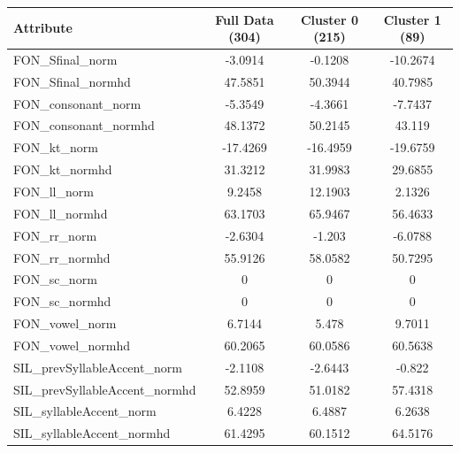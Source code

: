 \documentclass[11pt,a4paper,twoside]{tesis}
\begin{document}
\begin{table}[H]
\centering
\begin{tabular}{|l|c|c|c|}
\hline                                 
Attribute & Full Data (304)& Cluster 0 (215) & Cluster 1 (89) \\ \hline
\hline 
FON\_Sfinal\_norm                  &  -3.0914  &  -0.1208  & -10.2674 \\ \hline
FON\_Sfinal\_normhd                &  47.5851  &  50.3944  &  40.7985 \\ \hline 
FON\_consonant\_norm               &  -5.3549  &  -4.3661  &  -7.7437 \\ \hline
FON\_consonant\_normhd             &  48.1372  &  50.2145  &   43.119 \\ \hline
FON\_kt\_norm                      & -17.4269  & -16.4959  & -19.6759 \\ \hline
FON\_kt\_normhd                    &  31.3212  &  31.9983  &  29.6855 \\ \hline
FON\_ll\_norm                      &   9.2458  &  12.1903  &   2.1326 \\ \hline
FON\_ll\_normhd                    &  63.1703  &  65.9467  &  56.4633 \\ \hline
FON\_rr\_norm                      &  -2.6304  &   -1.203  &  -6.0788 \\ \hline
FON\_rr\_normhd                    &  55.9126  &  58.0582  &  50.7295 \\ \hline
FON\_sc\_norm                      &        0  &        0  &        0 \\ \hline
FON\_sc\_normhd                    &        0  &        0  &        0 \\ \hline
FON\_vowel\_norm                   &   6.7144  &    5.478  &   9.7011 \\ \hline
FON\_vowel\_normhd                 &  60.2065  &  60.0586  &  60.5638 \\ \hline
SIL\_prevSyllableAccent\_norm      &  -2.1108  &  -2.6443  &   -0.822 \\ \hline
SIL\_prevSyllableAccent\_normhd    &  52.8959  &  51.0182  &  57.4318 \\ \hline
SIL\_syllableAccent\_norm          &   6.4228  &   6.4887  &   6.2638 \\ \hline
SIL\_syllableAccent\_normhd        &  61.4295  &  60.1512  &  64.5176 \\ \hline

\end{tabular}
\end{table}
\end{document}
